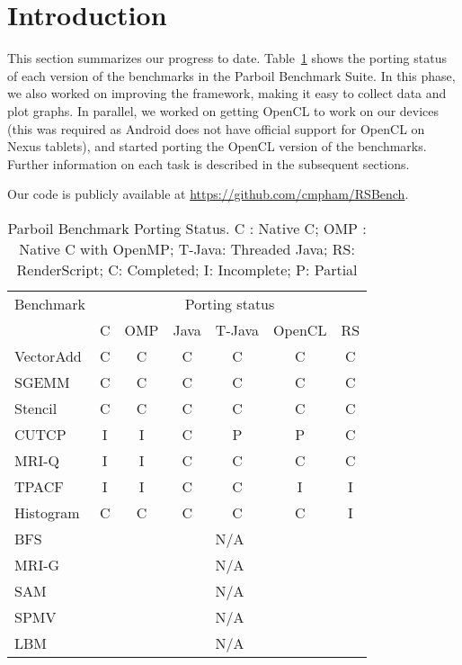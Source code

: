 \section*{Introduction}

This section summarizes our progress to date. Table~\ref{table:parboil} shows the
porting status of each version of the benchmarks in the Parboil Benchmark Suite.
In this phase, we also worked on improving the framework, making it easy to collect
data and plot graphs. In parallel, we worked on getting OpenCL to work on our
devices (this was required as Android does not have official support for OpenCL
on Nexus tablets), and started porting the OpenCL version of the benchmarks. 
Further information on each task is described in the subsequent sections.

Our code is publicly available at \url{https://github.com/cmpham/RSBench}.

\begin{table}[h]\small
\centering
\begin{tabular}{ | l | c | c | c | c | c | c |}
    \hline 
    Benchmark & \multicolumn{6}{|c|}{Porting status} \\ \cline{2-7}
                      & C & OMP & Java & T-Java & OpenCL & RS \\ \hline
    VectorAdd         & C & C   & C    & C      & C      & C \\ \hline
    SGEMM             & C & C   & C    & C      & C      & C \\ \hline
    Stencil           & C & C   & C    & C      & C      & C \\ \hline
    CUTCP             & I & I   & C    & P      & P      & C \\ \hline
    MRI-Q             & I & I   & C    & C      & C      & C \\ \hline
    TPACF             & I & I   & C    & C      & I      & I \\ \hline
    Histogram         & C & C   & C    & C      & C      & I \\ \hline
    BFS               & \multicolumn{6}{|c|}{N/A} \\ \hline
    MRI-G             & \multicolumn{6}{|c|}{N/A} \\ \hline
    SAM               & \multicolumn{6}{|c|}{N/A} \\ \hline
    SPMV              & \multicolumn{6}{|c|}{N/A} \\ \hline
    LBM               & \multicolumn{6}{|c|}{N/A} \\ \hline
    \hline
\end{tabular}
\caption{Parboil Benchmark Porting Status. C : Native C; OMP : Native C with
OpenMP; T-Java: Threaded Java; RS: RenderScript; C: Completed; I: Incomplete; P:
Partial}
\label{table:parboil}
\end{table}

